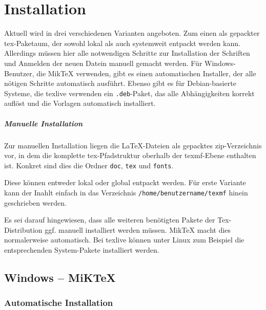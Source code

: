 \chapter{Installation}\label{chap:install}

Aktuell wird \tubslatex in drei verschiedenen Varianten angeboten.
Zum einen als gepackter tex-Paketaum, der sowohl lokal als auch systemweit
entpackt werden kann. Allerdings müssen hier alle notwendigen Schritte zur 
Installation der Schriften und Anmelden der neuen Datein manuell gemacht werden.
Für Windows-Benutzer, die MikTeX verwenden, gibt es einen automatischen
Installer, der alle nötigen Schritte automatisch ausführt.
Ebenso gibt es für Debian-basierte Systeme, die texlive verwenden ein
\texttt{.deb}-Paket, das alle Abhängigkeiten korrekt auflöst und die Vorlagen
automatisch installiert.


\paragraph{Manuelle Installation}

Zur manuellen Installation liegen die LaTeX-Dateien als gepacktes
zip-Verzeichnis vor, in dem die komplette tex-Pfadstruktur oberhalb der
texmf-Ebene enthalten ist. Konkret sind dies die Ordner
\lstinline{doc}, \lstinline{tex} und \lstinline{fonts}.

Diese können entweder lokal oder global entpackt werden.
Für erste Variante kann der Inahlt einfach in das Verzeichnis
\lstinline{/home/benutzername/texmf} hinein geschrieben werden.

Es sei darauf hingewiesen, dass alle weiteren benötigten Pakete der
Tex-Distribution ggf. manuell installiert werden müssen.
MikTeX macht dies normalerweise automatisch.
Bei texlive können unter Linux zum Beispiel die entsprechenden System-Pakete
installiert werden.

\clearpage
\section{Windows -- MiKTeX}

\subsection{Automatische Installation}



